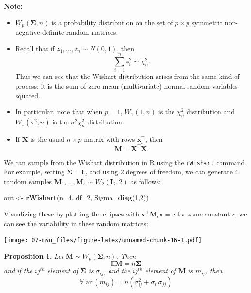 \documentclass[]{book}
\newenvironment{Shaded}{\begin{snugshade}}{\end{snugshade}}
\newcommand{\DataTypeTok}[1]{\textcolor[rgb]{0.13,0.29,0.53}{#1}}
\newcommand{\DecValTok}[1]{\textcolor[rgb]{0.00,0.00,0.81}{#1}}
\newcommand{\KeywordTok}[1]{\textcolor[rgb]{0.13,0.29,0.53}{\textbf{#1}}}
\newcommand{\NormalTok}[1]{#1}
\newcommand{\StringTok}[1]{\textcolor[rgb]{0.31,0.60,0.02}{#1}}
\newtheorem{proposition}{Proposition}[chapter]
\theoremstyle{definition}
\theoremstyle{definition}
\theoremstyle{definition}
\theoremstyle{remark}
\begin{document}
\textbf{Note:}

\begin{itemize}
\item
  \(W_p(\boldsymbol{\Sigma},n)\) is a probability distribution on the set of \(p \times p\) symmetric non-negative definite random matrices.
\item
  Recall that if \(z_1, \ldots, z_n \sim N(0, 1)\), then
  \[\sum_{i=1}^n z_i^2 \sim \chi^2_n.\]
  Thus we can see that the Wishart distribution arises from the same kind of process: it is the sum of zero mean (multivariate) normal random variables squared.
\item
  In particular, note that
  when \(p=1\), \(W_1(1,n)\) is the \(\chi_n^2\) distribution and \(W_1(\sigma^2,n)\) is the \(\sigma^2 \chi_n^2\) distribution. 
\item
  If \(\mathbf X\) is the usual \(n \times p\) matrix with rows \(\mathbf x_i^\top\), then
  \[\mathbf M= \mathbf X^\top \mathbf X.\]
\end{itemize}

We can sample from the Wishart distribution in R using the \texttt{rWishart} command. For example, setting \(\boldsymbol{\Sigma}=\mathbf I_2\) and using 2 degrees of freedom, we can generate 4 random samples \(\mathbf M_1, \ldots, \mathbf M_4 \sim W_2(\mathbf I_2, 2)\) as follows:

\begin{Shaded}
\begin{Highlighting}[]
\NormalTok{out <-}\StringTok{ }\KeywordTok{rWishart}\NormalTok{(}\DataTypeTok{n=}\DecValTok{4}\NormalTok{, }\DataTypeTok{df=}\DecValTok{2}\NormalTok{, }\DataTypeTok{Sigma=}\KeywordTok{diag}\NormalTok{(}\DecValTok{1}\NormalTok{,}\DecValTok{2}\NormalTok{))}
\end{Highlighting}
\end{Shaded}

Visualizing these by plotting the ellipses with \(\mathbf x^\top \mathbf M_i \mathbf x=c\) for some constant \(c\), we can see the variability in these random matrices:

\texttt{[image: 07-mvn\_files/figure-latex/unnamed-chunk-16-1.pdf]}

\begin{proposition}
\protect\hypertarget{prp:wishartmean}{}{\label{prp:wishartmean} }Let \(\mathbf M\sim W_p(\boldsymbol{\Sigma}, n)\). Then
\[{\mathbb{E}}\mathbf M= n \boldsymbol{\Sigma}\]
and if the \(ij^{th}\) element of \(\boldsymbol{\Sigma}\) is \(\sigma_{ij}\), and the \(ij^{th}\) element of \(\mathbf M\) is \(m_{ij}\), then
\[{\mathbb{V}\operatorname{ar}}(m_{ij}) =  n \left(\sigma_{ij}^2+\sigma_{ii}\sigma_{jj} \right)\]
\end{proposition}
\end{document}
